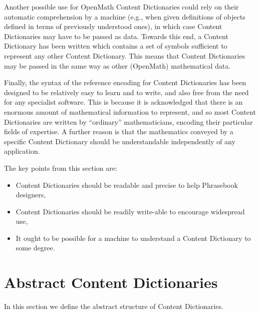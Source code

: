 \documentclass{report}
\def\textquote#1{``#1''}
\def\OM{OpenMath\xspace}
\begin{document}
    
Another possible use for \OM Content Dictionaries could rely on their automatic
comprehension by a machine (e.g., when given definitions of objects defined in terms of
previously understood ones), in which case Content Dictionaries may have to be passed as
data. Towards this end, a Content Dictionary has been written which contains a set of
symbols sufficient to represent any other Content Dictionary. This means that Content
Dictionaries may be passed in the same way as other (\OM) mathematical data.

    
Finally, the syntax of the reference encoding for Content Dictionaries has been designed
to be relatively easy to learn and to write, and also free from the need for any
specialist software. This is because it is acknowledged that there is an enormous amount
of mathematical information to represent, and so most Content Dictionaries are written by
\textquote{ordinary} mathematicians, encoding their particular fields of expertise.  A
further reason is that the mathematics conveyed by a specific Content Dictionary should be
understandable independently of any application.
    
The key points from this section are:
\begin{itemize}
\item Content Dictionaries should be readable and precise to help Phrasebook designers,
\item Content Dictionaries should be readily write-able to encourage widespread use,
\item It ought to be possible for a machine to understand a Content Dictionary to some
  degree.
\end{itemize}
  
\section{Abstract Content Dictionaries}\label{sect_func}
    
In this section we define the abstract structure of Content Dictionaries.

    
    
\end{document}

